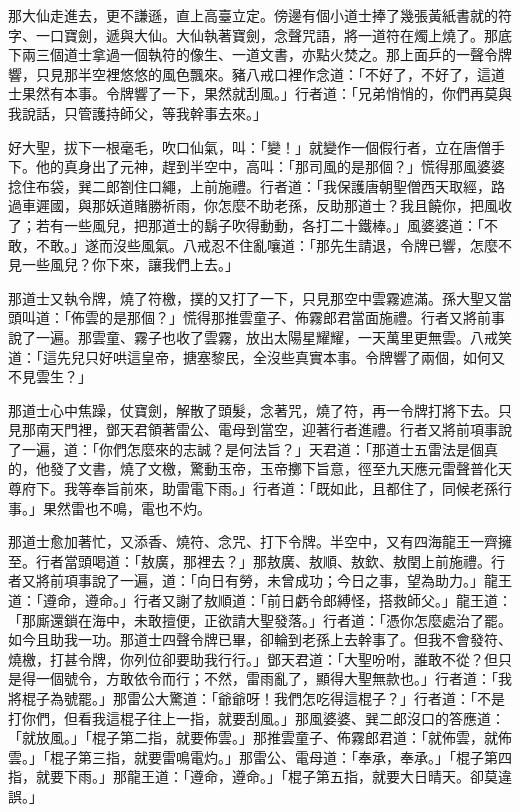 那大仙走進去，更不謙遜，直上高臺立定。傍邊有個小道士捧了幾張黃紙書就的符字、一口寶劍，遞與大仙。大仙執著寶劍，念聲咒語，將一道符在燭上燒了。那底下兩三個道士拿過一個執符的像生、一道文書，亦點火焚之。那上面乒的一聲令牌響，只見那半空裡悠悠的風色飄來。豬八戒口裡作念道：「不好了，不好了，這道士果然有本事。令牌響了一下，果然就刮風。」行者道：「兄弟悄悄的，你們再莫與我說話，只管護持師父，等我幹事去來。」

好大聖，拔下一根毫毛，吹口仙氣，叫：「變！」就變作一個假行者，立在唐僧手下。他的真身出了元神，趕到半空中，高叫：「那司風的是那個？」慌得那風婆婆捻住布袋，巽二郎劄住口繩，上前施禮。行者道：「我保護唐朝聖僧西天取經，路過車遲國，與那妖道賭勝祈雨，你怎麼不助老孫，反助那道士？我且饒你，把風收了；若有一些風兒，把那道士的鬍子吹得動動，各打二十鐵棒。」風婆婆道：「不敢，不敢。」遂而沒些風氣。八戒忍不住亂嚷道：「那先生請退，令牌已響，怎麼不見一些風兒？你下來，讓我們上去。」

那道士又執令牌，燒了符檄，撲的又打了一下，只見那空中雲霧遮滿。孫大聖又當頭叫道：「佈雲的是那個？」慌得那推雲童子、佈霧郎君當面施禮。行者又將前事說了一遍。那雲童、霧子也收了雲霧，放出太陽星耀耀，一天萬里更無雲。八戒笑道：「這先兒只好哄這皇帝，搪塞黎民，全沒些真實本事。令牌響了兩個，如何又不見雲生？」

那道士心中焦躁，仗寶劍，解散了頭髮，念著咒，燒了符，再一令牌打將下去。只見那南天門裡，鄧天君領著雷公、電母到當空，迎著行者進禮。行者又將前項事說了一遍，道：「你們怎麼來的志誠？是何法旨？」天君道：「那道士五雷法是個真的，他發了文書，燒了文檄，驚動玉帝，玉帝擲下旨意，徑至九天應元雷聲普化天尊府下。我等奉旨前來，助雷電下雨。」行者道：「既如此，且都住了，同候老孫行事。」果然雷也不鳴，電也不灼。

那道士愈加著忙，又添香、燒符、念咒、打下令牌。半空中，又有四海龍王一齊擁至。行者當頭喝道：「敖廣，那裡去？」那敖廣、敖順、敖欽、敖閏上前施禮。行者又將前項事說了一遍，道：「向日有勞，未曾成功；今日之事，望為助力。」龍王道：「遵命，遵命。」行者又謝了敖順道：「前日虧令郎縛怪，搭救師父。」龍王道：「那廝還鎖在海中，未敢擅便，正欲請大聖發落。」行者道：「憑你怎麼處治了罷。如今且助我一功。那道士四聲令牌已畢，卻輪到老孫上去幹事了。但我不會發符、燒檄，打甚令牌，你列位卻要助我行行。」鄧天君道：「大聖吩咐，誰敢不從？但只是得一個號令，方敢依令而行；不然，雷雨亂了，顯得大聖無款也。」行者道：「我將棍子為號罷。」那雷公大驚道：「爺爺呀！我們怎吃得這棍子？」行者道：「不是打你們，但看我這棍子往上一指，就要刮風。」那風婆婆、巽二郎沒口的答應道：「就放風。」「棍子第二指，就要佈雲。」那推雲童子、佈霧郎君道：「就佈雲，就佈雲。」「棍子第三指，就要雷鳴電灼。」那雷公、電母道：「奉承，奉承。」「棍子第四指，就要下雨。」那龍王道：「遵命，遵命。」「棍子第五指，就要大日晴天。卻莫違誤。」

